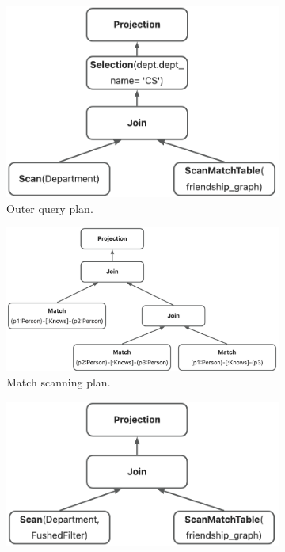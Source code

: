{\begin{figure}
    \centering
    \begin{subfigure}[b]{0.4\linewidth}
        \centering
        \includegraphics[width=\linewidth]{./figures/converged-logical-plan-relational.png}
        \caption{Outer query plan.}
        \label{fig:converged-logical-plan-relational}
    \end{subfigure}
    \begin{subfigure}[b]{0.4\linewidth}
        \centering
        \includegraphics[width=\linewidth]{./figures/converged-logical-plan-graph.png}
        \caption{Match scanning plan.}
        \label{fig:converged-logical-plan-graph}
    \end{subfigure}
    \begin{subfigure}[b]{0.4\linewidth}
        \centering
        \includegraphics[width=\linewidth]{./figures/converged-logical-plan-relational-optimized.png}

\end{subfigure}
\end{figure}}
